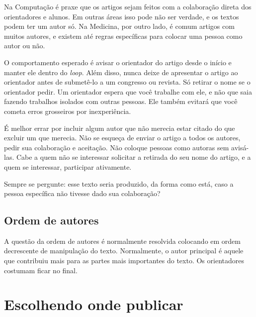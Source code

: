 Na Computação é praxe que os artigos sejam feitos com a colaboração direta dos orientadores e alunos.
Em outras áreas isso pode não ser verdade, e os textos podem ter um autor só. Na Medicina, por outro lado, é comum artigos com muitos autores, e existem até regras específicas para colocar uma pessoa como autor ou não.


O comportamento esperado é avisar o orientador do artigo desde o início e manter ele dentro do \textit{loop}. Além disso, nunca deixe de apresentar o artigo ao orientador antes de submetê-lo a um congresso ou revista. Só retirar o nome se o orientador pedir.  
Um orientador espera que você trabalhe com ele, e não que saia fazendo trabalhos isolados com outras pessoas. Ele também evitará que você cometa erros grosseiros por inexperiência. 

É melhor errar por incluir algum autor que não merecia estar citado do que excluir um que merecia. 
Não se esqueça de enviar o artigo a todos os autores, pedir sua colaboração e aceitação. 
Não coloque pessoas como autoras sem avisá-las.
Cabe a quem não se interessar solicitar a retirada do seu nome do artigo, e a quem se interessar, participar ativamente.

Sempre se pergunte: esse texto seria produzido, da forma como está, caso a pessoa específica não tivesse dado sua colaboração? 

\subsection{Ordem de autores}

A questão da ordem de autores é normalmente resolvida colocando em ordem decrescente de manipulação do texto. Normalmente, o autor principal é aquele que contribuiu mais para as partes mais importantes do texto. Os orientadores costumam ficar no final.

 \section{Escolhendo onde publicar}

